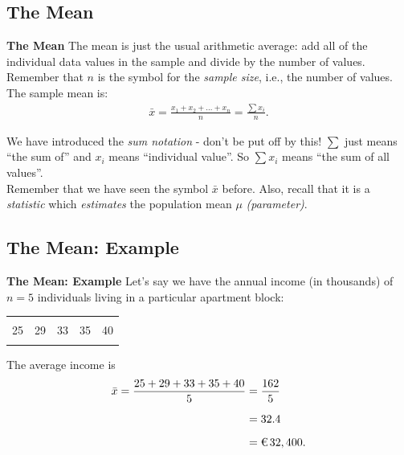 \documentclass[compress]{beamer}        %
\makeatletter
\newcommand{\tcb}{\textcolor{beamer@blendedblue}}
\makeatother
\begin{document}
\subsection{The Mean}
\begin{frame}{\bf \tcb{The Mean}}
The mean is just the usual arithmetic average: add all of the individual data values in the sample and divide by the number of values.\\[0.5cm]
Remember that {\boldmath$n$} is the symbol for the \emph{sample size}, i.e., the number of values. The sample mean is:\\[-0.6cm]

\begin{align*}
\boxed{\bar x = \frac{x_1 + x_2 + \ldots + x_n}{n} = \frac{\sum x_i}{n}}.
\end{align*}

We have introduced the \emph{sum notation} - don't be put off by this! $\sum$ just means ``the sum of'' and $x_i$ means ``individual value''. So $\sum x_i$ means ``the sum of all values''.\\[0.4cm]
Remember that we have seen the symbol $\bar x$ before. Also, recall that it is a \emph{statistic} which \emph{estimates} the population mean $\mu$ \emph{(parameter)}.

\end{frame}

\subsection{The Mean: Example}
\begin{frame}{\bf \tcb{The Mean: Example}}
Let's say we have the annual income (in thousands) of $n = 5$ individuals living in a particular apartment block:
\begin{center}
\begin{tabular}{|ccccc|}
\hline
&&&&\\[-0.4cm]
25 & 29 & 33 & 35 & 40 \\
\hline
\multicolumn{5}{c}{}\\
\end{tabular}
\end{center}
The average income is
\begin{align*}
\bar x = \frac{25 + 29 + 33 + 35 + 40}{5} &= \frac{162}{5} \\[0.2cm]
&= 32.4 \\[0.2cm]
&= \text{\texteuro\,} 32,400.
\end{align*}


\end{frame}
\end{document}
